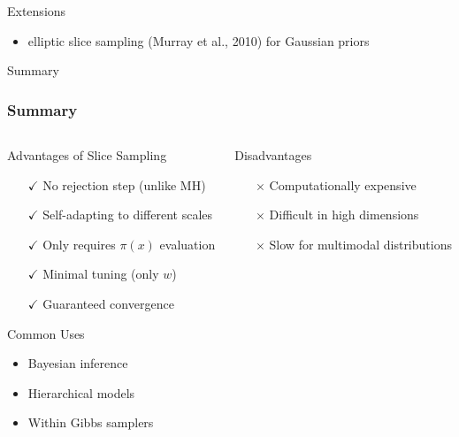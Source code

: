 \documentclass[aspectratio=169]{beamer}
\begin{document}
\begin{frame}{Extensions}
	\begin{itemize}
		\item elliptic slice sampling (Murray et al., 2010) for Gaussian priors
		\end{itemize}
\end{frame}

\begin{frame}{Summary}
	\frametitle{Summary}

	\begin{columns}[T]
		\begin{column}{0.48\textwidth}
			\begin{block}{Advantages of Slice Sampling}
				\begin{itemize}
					\item[$\checkmark$] No rejection step (unlike MH)
					\item[$\checkmark$] Self-adapting to different scales
					\item[$\checkmark$] Only requires $\pi(x)$ evaluation
					\item[$\checkmark$] Minimal tuning (only $w$)
					\item[$\checkmark$] Guaranteed convergence
				\end{itemize}
			\end{block}

			\begin{block}{Common Uses}
				\begin{itemize}
					\item Bayesian inference
					\item Hierarchical models
					\item Within Gibbs samplers
				\end{itemize}
			\end{block}
		\end{column}
		\begin{column}{0.48\textwidth}
			\begin{block}{Disadvantages}
				\begin{itemize}
					\item[$\times$] Computationally expensive
					\item[$\times$] Difficult in high dimensions
					\item[$\times$] Slow for multimodal distributions
				\end{itemize}
			\end{block}


\end{column}
\end{columns}
\end{frame}
\end{document}
